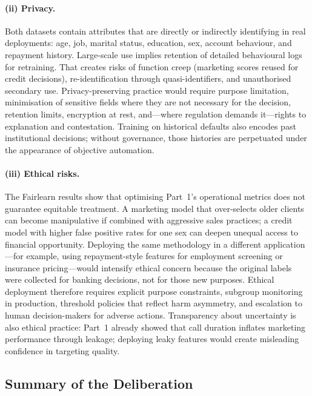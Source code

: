 \paragraph{(ii) Privacy.}
Both datasets contain attributes that are directly or indirectly identifying in
real deployments: age, job, marital status, education, sex, account behaviour,
and repayment history. Large-scale use implies retention of detailed behavioural
logs for retraining. That creates risks of function creep (marketing scores
reused for credit decisions), re-identification through quasi-identifiers, and
unauthorised secondary use. Privacy-preserving practice would require purpose
limitation, minimisation of sensitive fields where they are not necessary for
the decision, retention limits, encryption at rest, and---where regulation
demands it---rights to explanation and contestation. Training on historical
defaults also encodes past institutional decisions; without governance, those
histories are perpetuated under the appearance of objective automation.

\paragraph{(iii) Ethical risks.}
The Fairlearn results show that optimising Part~1's operational metrics does
not guarantee equitable treatment. A marketing model that over-selects older
clients can become manipulative if combined with aggressive sales practices; a
credit model with higher false positive rates for one sex can deepen unequal
access to financial opportunity. Deploying the same methodology in a different
application---for example, using repayment-style features for employment
screening or insurance pricing---would intensify ethical concern because the
original labels were collected for banking decisions, not for those new
purposes. Ethical deployment therefore requires explicit purpose constraints,
subgroup monitoring in production, threshold policies that reflect harm
asymmetry, and escalation to human decision-makers for adverse actions.
Transparency about uncertainty is also ethical practice: Part~1 already showed
that call duration inflates marketing performance through leakage; deploying
leaky features would create misleading confidence in targeting quality.

\subsection{Summary of the Deliberation}
\label{sec:part2-summary}

